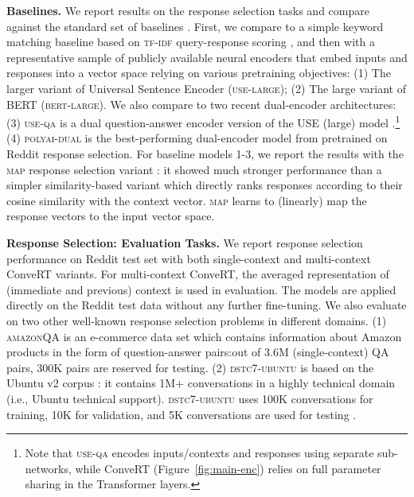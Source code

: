\documentclass[11pt,a4paper]{article}
\begin{document}
\vspace{1.3mm}
\noindent \textbf{Baselines.} 
We report results on the response selection tasks and compare against the standard set of baselines \cite{Henderson:2019arxiv}. First, we compare to a simple keyword matching baseline based on \textsc{tf-idf} query-response scoring \cite{Manning:2008ir}, and then with a representative sample of publicly available neural encoders that embed inputs and responses into a vector space relying on various pretraining objectives: (1) The larger variant of Universal Sentence Encoder \cite{Cer:2018arxiv} (\textsc{use-large}); (2) The large variant of BERT \cite{Devlin:2018arxiv} (\textsc{bert-large}). We also compare to two recent dual-encoder architectures: (3) \textsc{use-qa} is a dual question-answer encoder version of the USE (large) model \cite{Chidambaram:2019repl}.\footnote{Note that \textsc{use-qa} encodes inputs/contexts and responses using separate sub-networks, while ConveRT (Figure~\ref{fig:main-enc}) relies on full parameter sharing in the Transformer layers.} (4) \textsc{polyai-dual} is the best-performing dual-encoder model from  pretrained on Reddit response selection. For baseline models 1-3, we report the results with the \textsc{map} response selection variant \cite{Henderson:2019arxiv}: it showed much stronger performance than a simpler similarity-based variant which directly ranks responses according to their cosine similarity with the context vector. \textsc{map} learns to (linearly) map the response vectors to the input vector space.



\vspace{1.3mm}
\noindent \textbf{Response Selection: Evaluation Tasks.}
We report response selection performance on Reddit test set \cite{Henderson:2019arxiv} with both single-context and multi-context ConveRT variants. For multi-context ConveRT, the averaged representation of (immediate and previous) context is used in evaluation. The models are applied directly on the Reddit test data without any further fine-tuning. We also evaluate on two other well-known response selection problems in different domains. (1) \textsc{amazonQA} \cite{Wan:2016icdm} is an e-commerce data set which contains information about Amazon products in the form of question-answer pairs:out of 3.6M (single-context) QA pairs, 300K pairs are reserved for testing. (2) \textsc{dstc7-ubuntu} is based on the Ubuntu v2 corpus \cite{Lowe:2017dd}: it contains 1M+ conversations in a highly technical domain (i.e., Ubuntu technical support). \textsc{dstc7-ubuntu} uses 100K conversations for training, 10K for validation, and 5K conversations are used for testing \cite{Gunasekara:2019dstc7}.
\end{document}
